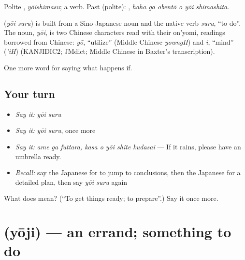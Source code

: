 Polite \textbf{}, \emph{yōishimasu}; a  verb. Past (polite): \textbf{  }, \emph{haha ga obentō o yōi shimashita}.

\begin{cousinweb}
\textbf{} (\emph{yōi suru}) is built from a Sino-Japanese noun and the native verb \emph{suru}, \textquotedblleft{}to do\textquotedblright{}. The noun, \emph{yōi}, is two Chinese characters read with their on'yomi, readings borrowed from Chinese: \emph{yō}, \textquotedblleft{}utilize\textquotedblright{} (Middle Chinese \emph{yowngH}) and \emph{i}, \textquotedblleft{}mind\textquotedblright{} (\emph{'iH}) (KANJIDIC2; JMdict; Middle Chinese in Baxter's transcription).
\end{cousinweb}

\begin{grammarlens}[title={What you've built}]
One more word for saying what happens if.
\end{grammarlens}

\subsection*{Your turn}
\begin{itemize}
\raggedright
  \item \emph{Say it:} \emph{yōi suru}
  \item \emph{Say it:} \emph{yōi suru}, once more
  \item \emph{Say it:} \emph{ame ga futtara, kasa o yōi shite kudasai} — If it rains, please have an umbrella ready.
  \item \emph{Recall:} say the Japanese for to jump to conclusions, then the Japanese for a detailed plan, then say \emph{yōi suru} again
\end{itemize}

\begin{tcolorbox}[breakable,colback=teal!4,colframe=teal!35!black,title={Before you move on}]
What does  mean? (\textquotedblleft{}To get things ready; to prepare\textquotedblright{}.) Say it once more.
\end{tcolorbox}
\section[\texorpdfstring{\ja{ようじ} (yōji)}{ようじ (yōji)}]{ (yōji) — an errand; something to do}

\label{lesson:JA-C344-youji}



